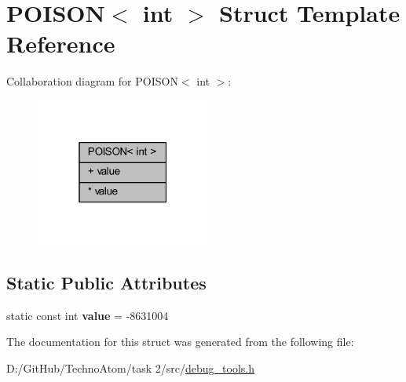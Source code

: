 \hypertarget{struct_p_o_i_s_o_n_3_01int_01_4}{}\section{P\+O\+I\+S\+ON$<$ int $>$ Struct Template Reference}
\label{struct_p_o_i_s_o_n_3_01int_01_4}


Collaboration diagram for P\+O\+I\+S\+ON$<$ int $>$\+:
\nopagebreak
\begin{figure}[H]
\begin{center}
\leavevmode
\includegraphics[width=163pt]{struct_p_o_i_s_o_n_3_01int_01_4__coll__graph}
\end{center}
\end{figure}
\subsection*{Static Public Attributes}
\textbf{ }\par
\begin{DoxyCompactItemize}
\item 
\mbox{\label{struct_p_o_i_s_o_n_3_01int_01_4_a4a7b41de4a6a4e91119dc2bfab15ba07}} 
static const int {\bfseries value} = -\/8631004
\end{DoxyCompactItemize}



The documentation for this struct was generated from the following file\+:\begin{DoxyCompactItemize}
\item 
D\+:/\+Git\+Hub/\+Techno\+Atom/task 2/src/\hyperlink{debug__tools_8h}{debug\+\_\+tools.\+h}\end{DoxyCompactItemize}
